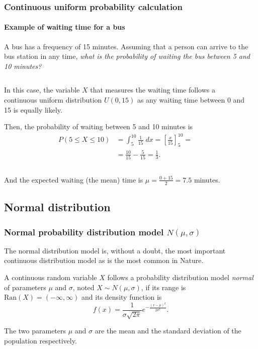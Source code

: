 \begin{frame}
\frametitle{Continuous uniform probability calculation}
\framesubtitle{Example of waiting time for a bus}
A bus has a frequency of 15 minutes. 
Assuming that a person can arrive to the bus station in any time, \emph{what is the probability of waiting the bus
between 5 and 10 minutes?}
\begin{columns}
\begin{column}{0.52\textwidth}
In this case, the variable $X$ that measures the waiting time follows a continuous uniform distribution $U(0,15)$ as any
waiting time between 0 and 15 is equally likely. 

Then, the probability of waiting between 5 and 10 minutes is
\begin{align*}
P(5\leq X\leq 10) &= \int_{5}^{10} \frac{1}{15}\;dx = \left[\frac{x}{15}\right]_5^{10} = \\
&= \frac{10}{15}-\frac{5}{15} =\frac{1}{3}.
\end{align*}
\end{column}
\begin{column}{0.43\textwidth}
\begin{center}
\end{center}
\end{column}
\end{columns}
And the expected waiting (the mean) time is $\mu=\frac{0+15}{2}=7.5$ minutes.
\end{frame}


\subsection{Normal distribution}

\begin{frame}
\frametitle{Normal probability distribution model $N(\mu,\sigma)$}
The normal distribution model is, without a doubt, the most important continuous distribution model as is the most
common in Nature.
\begin{definition}
A continuous random variable $X$ follows a probability distribution model \emph{normal} of parameters $\mu$ and
$\sigma$, noted $X\sim N(\mu,\sigma)$, if its range is $\mbox{Ran}(X) = (-\infty,\infty)$ and its density function is
\[
f(x)= \frac{1}{\sigma\sqrt{2\pi}}e^{-\frac{(x-\mu)^2}{2\sigma^2}}.
\]
\end{definition}

The two parameters $\mu$ and $\sigma$ are the mean and the standard deviation of the population respectively. 
\end{frame}


